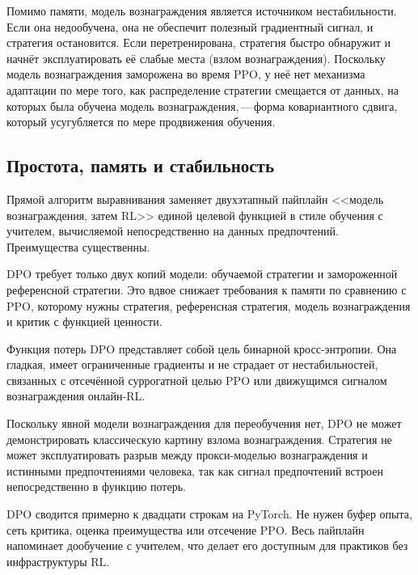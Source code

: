 Помимо памяти, модель вознаграждения является источником нестабильности. Если она недообучена, она не обеспечит полезный градиентный сигнал, и стратегия остановится. Если перетренирована, стратегия быстро обнаружит и начнёт эксплуатировать её слабые места (взлом вознаграждения). Поскольку модель вознаграждения заморожена во время PPO, у неё нет механизма адаптации по мере того, как распределение стратегии смещается от данных, на которых была обучена модель вознаграждения,\,---\,форма ковариантного сдвига, который усугубляется по мере продвижения обучения.

\subsection{Простота, память и стабильность}

Прямой алгоритм выравнивания заменяет двухэтапный пайплайн <<модель вознаграждения, затем RL>> единой целевой функцией в стиле обучения с учителем, вычисляемой непосредственно на данных предпочтений. Преимущества существенны.

\begin{description}[leftmargin=!,labelwidth=3.5cm]
  \item[Требования к памяти] DPO требует только двух копий модели: обучаемой стратегии и замороженной референсной стратегии. Это вдвое снижает требования к памяти по сравнению с PPO, которому нужны стратегия, референсная стратегия, модель вознаграждения и критик с функцией ценности.
  \item[Стабильность обучения] Функция потерь DPO представляет собой цель бинарной кросс-энтропии. Она гладкая, имеет ограниченные градиенты и не страдает от нестабильностей, связанных с отсечённой суррогатной целью PPO или движущимся сигналом вознаграждения онлайн-RL.
  \item[Отсутствие взлома вознаграждения] Поскольку явной модели вознаграждения для переобучения нет, DPO не может демонстрировать классическую картину взлома вознаграждения. Стратегия не может эксплуатировать разрыв между прокси-моделью вознаграждения и истинными предпочтениями человека, так как сигнал предпочтений встроен непосредственно в функцию потерь.
  \item[Простота реализации] DPO сводится примерно к двадцати строкам на PyTorch. Не нужен буфер опыта, сеть критика, оценка преимущества или отсечение PPO. Весь пайплайн напоминает дообучение с учителем, что делает его доступным для практиков без инфраструктуры RL.
\end{description}

